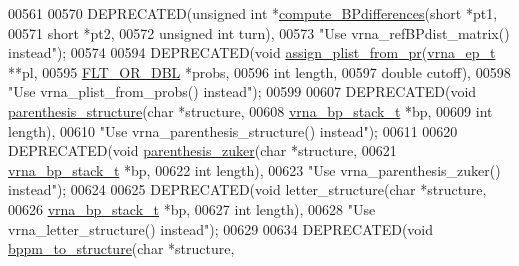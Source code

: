 \begin{DoxyCode}
00561 
00570 DEPRECATED(\textcolor{keywordtype}{unsigned} \textcolor{keywordtype}{int} *\hyperlink{group__struct__utils_gadd463184355d0803b6ee6e09f29182f2}{compute\_BPdifferences}(\textcolor{keywordtype}{short}        *pt1,
00571                                                \textcolor{keywordtype}{short}        *pt2,
00572                                                \textcolor{keywordtype}{unsigned} \textcolor{keywordtype}{int} turn),
00573 \textcolor{stringliteral}{"Use vrna\_refBPdist\_matrix() instead"});
00574 
00594 DEPRECATED(\textcolor{keywordtype}{void}  \hyperlink{group__pf__fold_ga1cc05aaa9b0e7df2d3887e98321c2030}{assign\_plist\_from\_pr}(\hyperlink{group__struct__utils_structvrna__elem__prob__s}{vrna\_ep\_t}   **pl,
00595                                       \hyperlink{group__data__structures_ga31125aeace516926bf7f251f759b6126}{FLT\_OR\_DBL}  *probs,
00596                                       \textcolor{keywordtype}{int}         length,
00597                                       \textcolor{keywordtype}{double}      cutoff),
00598 \textcolor{stringliteral}{"Use vrna\_plist\_from\_probs() instead"});
00599 
00607 DEPRECATED(\textcolor{keywordtype}{void} \hyperlink{group__struct__utils_gadf0ad2d46c9ca7b850437d1b79627a7e}{parenthesis\_structure}(\textcolor{keywordtype}{char}            *structure,
00608                                       \hyperlink{group__data__structures_structvrna__bp__stack__s}{vrna\_bp\_stack\_t} *bp,
00609                                       \textcolor{keywordtype}{int}             length),
00610 \textcolor{stringliteral}{"Use vrna\_parenthesis\_structure() instead"});
00611 
00620 DEPRECATED(\textcolor{keywordtype}{void} \hyperlink{group__struct__utils_gab9c5c8311bd5120900585d4fa50c2df0}{parenthesis\_zuker}(\textcolor{keywordtype}{char}            *structure,
00621                                   \hyperlink{group__data__structures_structvrna__bp__stack__s}{vrna\_bp\_stack\_t} *bp,
00622                                   \textcolor{keywordtype}{int}             length),
00623 \textcolor{stringliteral}{"Use vrna\_parenthesis\_zuker() instead"});
00624 
00625 DEPRECATED(\textcolor{keywordtype}{void} letter\_structure(\textcolor{keywordtype}{char}             *structure,
00626                                  \hyperlink{group__data__structures_structvrna__bp__stack__s}{vrna\_bp\_stack\_t}  *bp,
00627                                  \textcolor{keywordtype}{int}              length),
00628 \textcolor{stringliteral}{"Use vrna\_letter\_structure() instead"});
00629 
00634 DEPRECATED(\textcolor{keywordtype}{void}  \hyperlink{group__struct__utils_ga129d81c4a1ead793c5b2311333e03dfa}{bppm\_to\_structure}(\textcolor{keywordtype}{char}         *structure,

\end{DoxyCode}
